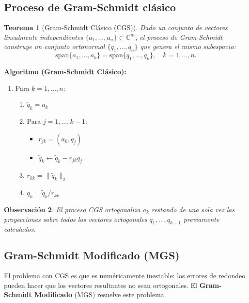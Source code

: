 \documentclass[a4paper,11pt]{report}
\newtheorem{theorem}{Teorema}[chapter]
\newtheorem{remark}[theorem]{Observación}
\begin{document}
\subsection{Proceso de Gram-Schmidt clásico}

\begin{theorem}[Gram-Schmidt Clásico (CGS)]
Dado un conjunto de vectores linealmente independientes $\{a_1, \ldots, a_n\} \subset \mathbb{C}^m$, el proceso de Gram-Schmidt construye un conjunto ortonormal $\{q_1, \ldots, q_n\}$ que genera el mismo subespacio:
\[
\text{span}\{a_1, \ldots, a_k\} = \text{span}\{q_1, \ldots, q_k\}, \quad k = 1, \ldots, n.
\]
\end{theorem}

\textbf{Algoritmo (Gram-Schmidt Clásico):}
\begin{enumerate}
\item Para $k = 1, \ldots, n$:
   \begin{enumerate}
   \item $\tilde{q}_k = a_k$
   \item Para $j = 1, \ldots, k-1$:
      \begin{itemize}
      \item $r_{jk} = (a_k, q_j)$
      \item $\tilde{q}_k \leftarrow \tilde{q}_k - r_{jk} q_j$
      \end{itemize}
   \item $r_{kk} = \|\tilde{q}_k\|_2$
   \item $q_k = \tilde{q}_k / r_{kk}$
   \end{enumerate}
\end{enumerate}

\begin{remark}
El proceso CGS ortogonaliza $a_k$ restando de una sola vez las proyecciones sobre todos los vectores ortogonales $q_1, \ldots, q_{k-1}$ previamente calculados.
\end{remark}

\subsection{Gram-Schmidt Modificado (MGS)}

El problema con CGS es que es numéricamente inestable: los errores de redondeo pueden hacer que los vectores resultantes no sean ortogonales. El \textbf{Gram-Schmidt Modificado} (MGS) resuelve este problema.
\end{document}
